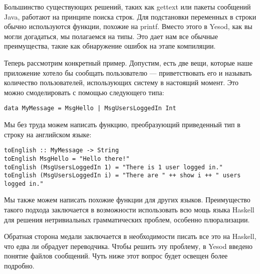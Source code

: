 Большинство существующих решений, таких как gettext или пакеты сообщений Java, работают на принципе поиска строк. Для подстановки переменных в строки обычно используются функции, похожие на printf. Вместо этого в Yesod, как вы могли догадаться, мы полагаемся на типы. Это дает нам все обычные преимущества, такие как обнаружение ошибок на этапе компиляции.

Теперь рассмотрим конкретный пример. Допустим, есть две вещи, которые наше приложение хотело бы сообщать пользователю --- приветствовать его и называть количество пользователей, использующих систему в настоящий момент. Это можно смоделировать с помощью следующего типа:

\begin{lstlisting}
data MyMessage = MsgHello | MsgUsersLoggedIn Int
\end{lstlisting}

Мы без труда можем написать функцию, преобразующий приведенный тип в строку на английском языке:

\begin{lstlisting}
toEnglish :: MyMessage -> String
toEnglish MsgHello = "Hello there!"
toEnglish (MsgUsersLoggedIn 1) = "There is 1 user logged in."
toEnglish (MsgUsersLoggedIn i) = "There are " ++ show i ++ " users logged in."
\end{lstlisting}

Мы также можем написать похожие функции для других языков. Преимущество такого подхода заключается в возможности использовать всю мощь языка Haskell для решения нетривиальных грамматических проблем, особенно плюрализации. %


Обратная сторона медали заключается в необходимости писать все это на Haskell, что едва ли обрадует переводчика. Чтобы решить эту проблему, в Yesod введено понятие файлов сообщений. Чуть ниже этот вопрос будет освещен более подробно. %

